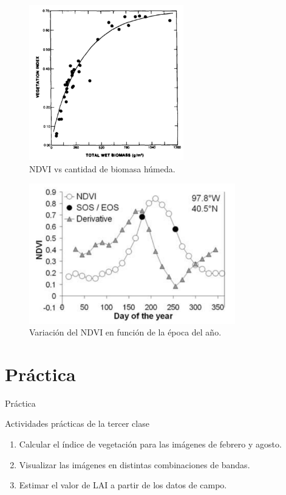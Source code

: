 \documentclass[handout]{beamer}
\begin{document}
\begin{frame}{\subsecname}
    \begin{figure}
    \centering
    \includegraphics[width=0.6\textwidth]{imagenes/avndvi.png}
    \caption{NDVI vs cantidad de biomasa húmeda.}
    \end{figure}
\end{frame}



\begin{frame}{\subsecname}
    \begin{figure}
    \centering
    \includegraphics[width=0.8\textwidth]{imagenes/ndvivst.png}
    \caption{Variación del NDVI en función de la época del año.}
    \end{figure}
\end{frame}


\section{Práctica}

\begin{frame}{Práctica}
  \begin{exampleblock}{Actividades prácticas de la tercer clase}
    \begin{enumerate}
      \item Calcular el índice de vegetación para las imágenes de febrero y agosto.
      \item Visualizar las imágenes en distintas combinaciones de bandas.
      \item Estimar el valor de LAI a partir de los datos de campo.
    \end{enumerate}
  \end{exampleblock}
\end{frame}
\end{document}
